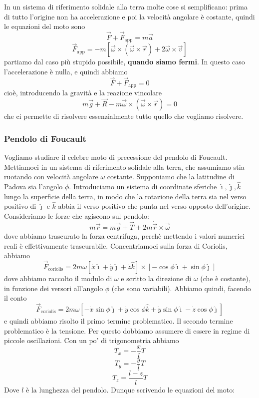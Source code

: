 \documentclass[11pt]{scrartcl}
\newcommand{\ihat}{\hat{\imath}}
\newcommand{\jhat}{\hat{\jmath}}
\newcommand{\khat}{\hat{k}}
\newcommand{\veloc}{\dot{\vec{r}}}
\newcommand{\accel}{\ddot{\vec{r}}}
\begin{document}
	In un sistema di riferimento solidale alla terra molte cose si semplificano: prima di tutto l'origine non ha accelerazione e poi la velocità angolare è costante, quindi le equazioni del moto sono
	$$\vec{F}+\vec{F}_{\text{app}}=m\vec{a}$$
	$$\vec{F}_{\text{app}}=-m\left[\vec{\omega}\times \left(\vec{\omega}\times \vec{r}\right)+2\vec{\omega}\times\vec{v}\right]$$
	partiamo dal caso più stupido possibile, \textbf{quando siamo fermi}. In questo caso l'accelerazione è nulla, e quindi abbiamo
	$$\vec{F}+\vec{F}_\text{app}=0$$
	cioè, introducendo la gravità e la reazione vincolare
	$$m\vec{g}+\vec{R}-m\vec{\omega}\times\left(\vec{\omega}\times\vec{r}\right)=0$$
	che ci permette di risolvere essenzialmente tutto quello che vogliamo risolvere.
	
	\subsubsection{Pendolo di Foucault}
	Vogliamo studiare il celebre moto di precessione del pendolo di Foucault. Mettiamoci in un sistema di riferimento solidale alla terra, che assumiamo stia ruotando con velocità angolare $\omega$ costante. Supponiamo che la latitudine di Padova sia l'angolo $\phi$. Introduciamo un sistema di coordinate sferiche $\ihat,\jhat,\khat$ lungo la superficie della terra, in modo che la rotazione della terra sia nel verso positivo di $\jhat$ e $\khat$ abbia il verso positivo che punta nel verso opposto dell'origine. Consideriamo le forze che agiscono sul pendolo:
	$$m\accel=m\vec{g}+\vec{T}+2m\veloc\times\vec{\omega}$$
	dove abbiamo trascurato la forza centrifuga, perchè mettendo i valori numerici reali è effettivamente trascurabile. Concentriamoci sulla forza di Coriolis, abbiamo
	$$\vec{F}_\text{coriolis}=2m\omega \left[\dot{x}\ihat+\dot{y}\jhat+\dot{z}\khat\right]\times\left[-\cos\phi \ihat+\sin\phi\jhat\right]$$
	dove abbiamo raccolto il modulo di $\omega$ e scritto la direzione di $\omega$ (che è costante), in funzione dei versori all'angolo $\phi$ (che sono variabili). Abbiamo quindi, facendo il conto
	$$\vec{F}_\text{coriolis}=2m\omega \left[-\dot{x}\sin\phi \jhat+\dot{y}\cos\phi \khat+\dot{y}\sin\phi \ihat-\dot{z}\cos\phi \jhat\right]$$
	e quindi abbiamo risolto il primo termine problematico. Il secondo termine problematico è la tensione. Per questo dobbiamo assumere di essere in regime di piccole oscillazioni. Con un po' di trigonometria abbiamo
	$$T_x=-\frac{x}{l}T$$
	$$T_y=-\frac{y}{l}T$$
	$$T_z=\frac{l-z}{l}T$$
	Dove $l$ è la lunghezza del pendolo. Dunque scrivendo le equazioni del moto:
\end{document}
